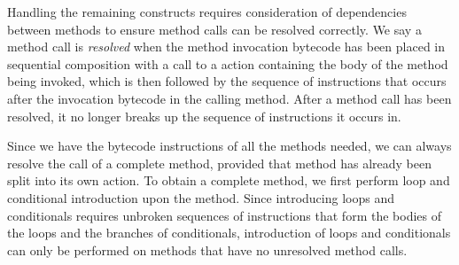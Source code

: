 Handling the remaining constructs requires consideration of
dependencies between methods to ensure method calls can be resolved
correctly.
We say a method call is \emph{resolved} when the method invocation
bytecode has been placed in sequential composition with a call to a
\Circus{} action containing the body of the method being invoked,
which is then followed by the sequence of instructions that occurs
after the invocation bytecode in the calling method.
After a method call has been resolved, it no longer breaks up the
sequence of instructions it occurs in.

Since we have the bytecode instructions of all the methods needed, we
can always resolve the call of a complete method, provided that method
has already been split into its own \Circus{} action.
To obtain a complete method, we first perform loop and conditional
introduction upon the method.
Since introducing loops and conditionals requires unbroken sequences
of instructions that form the bodies of the loops and the branches of
conditionals, introduction of loops and conditionals can only be
performed on methods that have no unresolved method calls.

